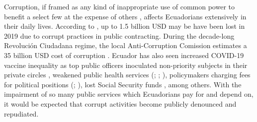 \documentclass[12pt,a4]{article}\usepackage[]{graphicx}\usepackage[]{xcolor}
\begin{document}
\begin{figure}[htbp]
\end{figure}

Corruption, if framed as any kind of inappropriate use of common power to benefit a select few at the expense of others \parencite{Warren.2004}, affects Ecuadorians extensively in their daily lives. According to \textcite{AlarconSalvador.2020}, up to 1.5 billion USD may be have been lost in 2019 due to corrupt practices in public contracting. During the decade-long Revolución Ciudadana regime, the local Anti-Corruption Comission estimates a 35 billion USD cost of corruption \parencite{RoaChejin.2020}. Ecuador has also seen increased COVID-19 vaccine inequality as top public officers inoculated non-priority subjects in their private circles \parencite{Taj.2021}, weakened public health services (\cite{Celi.2020}; \cite{Comercio.2021}; \cite{RoaChejin.2020}), policymakers charging fees for political positions (\cite{Espinosa.2021}; \cite{Gonzalez.2021}), lost Social Security funds \parencite{Pesantes.9152020}, among others. With the impairment of so many public services which Ecuadorians pay for and depend on, it would be expected that corrupt activities become publicly denounced and repudiated.
\end{document}
